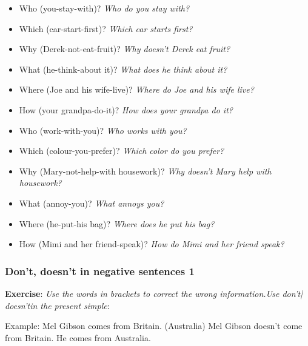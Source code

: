 \begin{itemize}
\item Who (you-stay-with)? \textit{Who do you stay with?}
\item Which (car-start-first)? \textit{Which car starts first?}
\item Why (Derek-not-eat-fruit)? \textit{Why doesn't Derek eat fruit?}
\item What (he-think-about it)? \textit{What does he think about it?}
\item Where (Joe and his wife-live)? \textit{Where do Joe and his wife live?}
\item How (your grandpa-do-it)? \textit{How does your grandpa do it?}
\item Who (work-with-you)? \textit{Who works with you?}
\item Which (colour-you-prefer)? \textit{Which color do you prefer?}
\item Why (Mary-not-help-with housework)? \textit{Why doesn't Mary help with housework?}
\item What (annoy-you)? \textit{What annoys you?}
\item Where (he-put-his bag)? \textit{Where does he put his bag?}
\item How (Mimi and her friend-speak)? \textit{How do Mimi and her friend speak?}
\end{itemize}

\subsubsection{Don't, doesn't in negative sentences 1}

\textbf{Exercise}: \textit{Use the words in brackets to correct the wrong information.Use don't| doesn'tin the present simple}:

Example:
Mel Gibson comes from Britain. (Australia)
Mel Gibson doesn't come from Britain. He comes from Australia.

